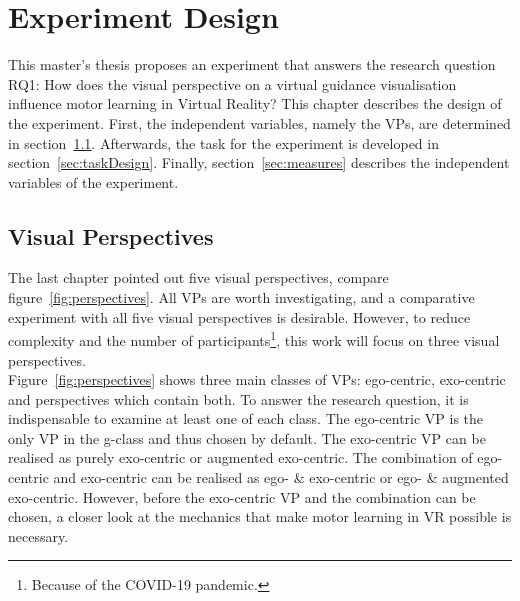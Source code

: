 \chapter{Experiment Design}
\label{chapter:studysetting_conduction}
This master's thesis proposes an experiment that answers the research question RQ1: How does the visual perspective on a virtual guidance visualisation influence motor learning in Virtual Reality? This chapter describes the design of the experiment. First, the independent variables, namely the VPs, are determined in section~\ref{sec:visualPerspecticves}. Afterwards, the task for the experiment is developed in section~\ref{sec:taskDesign}. Finally, section~\ref{sec:measures} describes the independent variables of the experiment.

\section{Visual Perspectives}
\label{sec:visualPerspecticves}
The last chapter pointed out five visual perspectives, compare figure~\ref{fig:perspectives}. All VPs are worth investigating, and a comparative experiment with all five visual perspectives is desirable. However, to reduce complexity and the number of participants\footnote{Because of the COVID-19 pandemic.}, this work will focus on three visual perspectives.\\
Figure~\ref{fig:perspectives} shows three main classes of VPs: ego-centric, exo-centric and perspectives which contain both. To answer the research question, it is indispensable to examine at least one of each class. The ego-centric VP is the only VP in the g-class and thus chosen by default. The exo-centric VP can be realised as purely exo-centric or augmented exo-centric. The combination of ego-centric and exo-centric can be realised as ego- \& exo-centric or ego- \& augmented exo-centric. However, before the exo-centric VP and the combination can be chosen, a closer look at the mechanics that make motor learning in VR possible is necessary.

